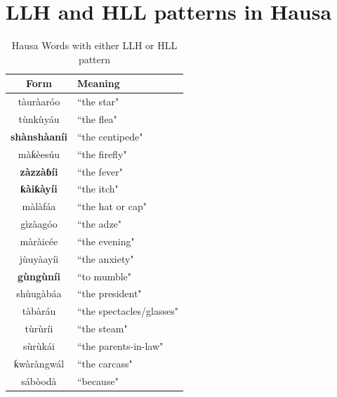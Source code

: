 \documentclass[11pt,letterpaper]{article}
\begin{document}
\section{LLH and HLL patterns in Hausa}
\begin{table}[H]
	\centering
	\begin{tabular}{c|l}
		\hline
		\textbf{Form} & \textbf{Meaning} \\
		\hline
		tàuràaróo & ``the star" \\
		tùnkùyáu & ``the flea" \\
		\textbf{shànshàaníi} & ``the centipede" \\
		màƙèesúu & ``the firefly" \\
		\textbf{zàzzàɓíi} & ``the fever" \\
		\textbf{ƙàiƙàyíi} & ``the itch" \\
		màlàfáa & ``the hat or cap" \\
		gìzàagóo & ``the adze" \\
		màràicée & ``the evening" \\
		jùuyàayíi & ``the anxiety" \\
		\textbf{gùngùníi} & ``to mumble" \\
		shùugàbáa & ``the president" \\
		tàbàráu & ``the spectacles/glasses" \\
		tùrùríi & ``the steam" \\
		sùrùkái & ``the parents-in-law" \\
		ƙwàràngwál & ``the carcass" \\
		sábòodà & ``because" \\
		\hline
	\end{tabular}
	\caption{Hausa Words with either LLH or HLL pattern}
	\label{tab:hausawords}
\end{table}




\end{document}
